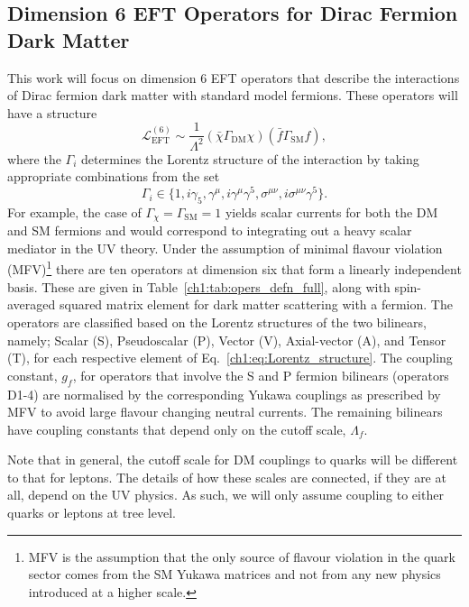 \subsection{Dimension 6 EFT Operators for Dirac Fermion Dark Matter}
This work will focus on dimension 6 EFT operators that describe the interactions of Dirac fermion dark matter with standard model fermions. These operators will have a structure 
\begin{equation}
    \mathcal{L}_\mathrm{EFT}^{(6)} \sim \frac{1}{\Lambda^2}(\bar{\chi}\Gamma_\mathrm{DM} \chi)(\bar{f}\Gamma_{\mathrm{SM}}f),
\end{equation}
where the $\Gamma_i$ determines the Lorentz structure of the interaction by taking appropriate combinations from the set
\begin{equation}
    \Gamma_i\in \{1, i\gamma_5, \gamma^\mu, i\gamma^\mu \gamma^5, \sigma^{\mu\nu}, i \sigma^{\mu\nu}\gamma^5\}.\label{ch1:eq:Lorentz_structure}
\end{equation}
For example, the case of $\Gamma_\chi = \Gamma_\mathrm{SM} = 1$ yields scalar currents for both the DM and SM fermions and would correspond to integrating out a heavy scalar mediator in the UV theory. Under the assumption of minimal flavour violation (MFV)\footnote{MFV is the assumption that the only source of flavour violation in the quark sector comes from the SM Yukawa matrices and not from any new physics introduced at a higher scale.} there are ten operators at dimension six that form a linearly independent basis. These are given in Table~\ref{ch1:tab:opers_defn_full}, along with spin-averaged squared matrix element for dark matter scattering with a fermion. 
The operators are classified based on the Lorentz structures of the two bilinears, namely; Scalar (S), Pseudoscalar (P), Vector (V), Axial-vector (A), and Tensor (T), for each respective element of Eq.~\ref{ch1:eq:Lorentz_structure}.
The coupling constant, $g_f$, for operators that involve the S and P fermion bilinears (operators D1-4) are normalised by the corresponding Yukawa couplings as prescribed by MFV to avoid large flavour changing neutral currents. The remaining bilinears have coupling constants that depend only on the cutoff scale, $\Lambda_f$.

Note that in general, the cutoff scale for DM couplings to quarks will be different to that for leptons. The details of how these scales are connected, if they are at all, depend on the UV physics. As such, we will only assume coupling to either quarks or leptons at tree level. 


